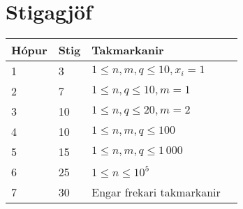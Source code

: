 \section*{Stigagjöf}
\begin{tabular}{|l|l|l|l|}
\hline
Hópur & Stig & Takmarkanir \\ \hline
1     & 3    & $1 \le n,m,q \le 10, x_i = 1$\\ \hline
2     & 7    & $1 \le n,q \le 10, m = 1$\\ \hline
3     & 10   & $1 \le n,q \le 20, m = 2$\\ \hline
4     & 10   & $1 \le n,m,q \le 100$\\ \hline
5     & 15   & $1 \le n,m,q \le 1\,000 $ \\ \hline
6     & 25   & $1 \le n \le 10^5$ \\ \hline
7     & 30   & Engar frekari takmarkanir \\ \hline
\end{tabular}
